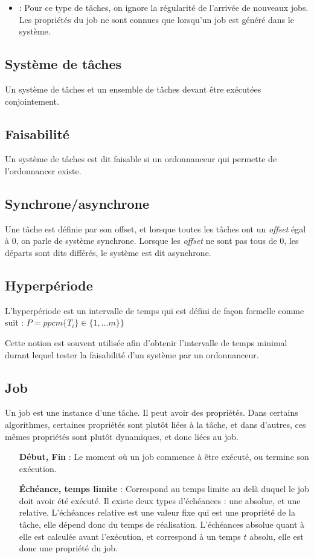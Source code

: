 \documentclass[11pt,a4paper,oneside]{report}
\newcommand{\customhighlight}[1]{{\color{olive}{\textbf{#1}}}}
\begin{document}
\begin{itemize}
		\item \customhighlight{Tâche apériodique} : Pour ce type de tâches, on ignore la régularité de 
		l'arrivée de nouveaux jobs. Les propriétés du job ne sont connues que lorsqu'un job est 
		généré dans le système.
		
	\end{itemize}
	
	\subsection{Système de tâches}
	Un système de tâches et un ensemble de tâches devant être exécutées conjointement. 
	
	\subsection{Faisabilité}
	Un système de tâches est dit faisable si un ordonnanceur qui permette de 
	l'ordonnancer existe.
	
	\subsection{Synchrone/asynchrone}
	Une tâche est définie par son offset, et lorsque toutes les tâches ont un \textit{offset} égal à 0, on parle de 
	système synchrone. Lorsque les \textit{offset} ne sont pas tous de 0, les départs sont dits différés, 
	le système est dit asynchrone.
	
	\subsection{Hyperpériode}
	L'hyperpériode est un intervalle de temps qui est défini de façon formelle comme suit :\medskip
	$P = ppcm\{T_i\} \in \{1,... m\}\}$
	
	Cette notion est souvent utilisée afin d'obtenir l'intervalle de temps 
	minimal durant lequel tester la faisabilité d'un système par un ordonnanceur.
	
	\subsection{Job}
	Un job est une instance d'une tâche. 
	Il peut avoir des propriétés. 
	Dans certains algorithmes, certaines propriétés sont plutôt liées à la tâche, 
	et dans d'autres, ces mêmes propriétés sont plutôt dynamiques, et donc liées au job.
	\begin{itemize}
		\item[\textbf{Début, Fin}] : Le moment où un job commence à être exécuté, ou termine son exécution.
		\item[\textbf{Échéance, temps limite}] : Correspond au temps limite au delà duquel le job doit avoir été exécuté. Il existe deux types d'échéances : 
		une absolue, et une relative. L'échéances relative est une valeur fixe qui 
		est une propriété de la tâche, elle dépend donc du temps de réalisation.\medskip
		L'échéances absolue quant à elle est calculée avant l'exécution, et correspond 
		à un temps $t$ absolu, elle est donc une propriété du job.
	\end{itemize}
	
\end{document}
